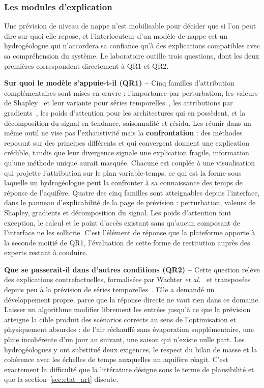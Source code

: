 \subsubsection{Les modules d'explication}
\label{sec:xai}

Une prévision de niveau de nappe n'est mobilisable pour décider que si l'on peut dire sur quoi elle repose, et l'interlocuteur d'un modèle de nappe est un hydrogéologue qui n'accordera sa confiance qu'à des explications compatibles avec sa compréhension du système. Le laboratoire outille trois questions, dont les deux premières correspondent directement à QR1 et QR2.

\medskip
\noindent
\textbf{Sur quoi le modèle s'appuie-t-il (QR1) --} Cinq familles d'attribution complémentaires sont mises en œuvre : l'importance par perturbation, les valeurs de Shapley~\cite{lundberg2017shap} et leur variante pour séries temporelles~\cite{bento2021timeshap}, les attributions par gradients~\cite{sundararajan2017ig, captum}, les poids d'attention pour les architectures qui en possèdent, et la décomposition du signal en tendance, saisonnalité et résidu. Les réunir dans un même outil ne vise pas l'exhaustivité mais la \textbf{confrontation} : des méthodes reposant sur des principes différents et qui convergent donnent une explication crédible, tandis que leur divergence signale une explication fragile, information qu'une méthode unique aurait masquée. Chacune est couplée à une visualisation qui projette l'attribution sur le plan variable-temps, ce qui est la forme sous laquelle un hydrogéologue peut la confronter à sa connaissance des temps de réponse de l'aquifère. Quatre des cinq familles sont atteignables depuis l'interface, dans le panneau d'explicabilité de la page de prévision : perturbation, valeurs de Shapley, gradients et décomposition du signal. Les poids d'attention font exception, le calcul et le point d'accès existant sans qu'aucun composant de l'interface ne les sollicite. C'est l'élément de réponse que la plateforme apporte à la seconde moitié de QR1, l'évaluation de cette forme de restitution auprès des experts restant à conduire.

\medskip
\noindent
\textbf{Que se passerait-il dans d'autres conditions (QR2) --} Cette question relève des explications contrefactuelles, formalisées par Wachter \emph{et al.}~\cite{wachter2018counterfactual} et transposées depuis peu à la prévision de séries temporelles~\cite{wang2023forecastcf}. Elle a demandé un développement propre, parce que la réponse directe ne vaut rien dans ce domaine. Laisser un algorithme modifier librement les entrées jusqu'à ce que la prévision atteigne la cible produit des scénarios corrects au sens de l'optimisation et physiquement absurdes : de l'air réchauffé sans évaporation supplémentaire, une pluie incohérente d'un jour au suivant, une saison qui n'existe nulle part. Les hydrogéologues y ont substitué deux exigences, le respect du bilan de masse et la cohérence avec les échelles de temps auxquelles un aquifère réagit. C'est exactement la difficulté que la littérature désigne sous le terme de plausibilité et que la section~\ref{sec:etat_art} discute.

